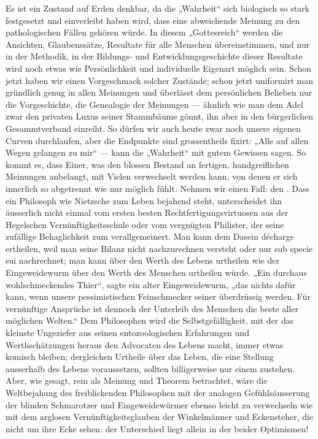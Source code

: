 Es ist ein Zustand auf Erden denkbar, da die „Wahrheit“ sich biologisch so stark festgesetzt und einverleibt haben wird, dass eine abweichende Meinung zu den pathologischen Fällen gehören würde. In diesem „Gottesreich“ werden die Ansichten, Glaubenssätze, Resultate für alle Menschen übereinstimmen, und nur in der Methodik, in der Bildungs- und Entwicklungsgeschichte dieser Resultate wird noch etwas wie Persönlichkeit und individuelle Eigenart möglich sein. Schon jetzt haben wir einen Vorgeschmack solcher Zustände; schon jetzt uniformirt man gründlich genug in allen Meinungen und überlässt dem persönlichen Belieben nur die Vorgeschichte, die Genealogie der Meinungen — ähnlich wie man dem Adel zwar den privaten Luxus seiner Stammbäume gönnt, ihn aber  in den bürgerlichen Gesammtverband einreiht. So dürfen wir auch heute zwar noch unsere eigenen Curven durchlaufen, aber die Endpunkte sind grossentheils fixirt: „Alle auf allen Wegen gelangen zu mir“ — kann die „Wahrheit“ mit gutem Gewissen sagen. So kommt es, dass Einer, was den blossen Bestand an fertigen, handgreiflichen Meinungen anbelangt, mit Vielen verwechselt werden kann, von denen er sich innerlich so abgetrennt wie nur möglich fühlt. Nehmen wir einen Fall: den . Dass ein Philosoph wie Nietzsche zum Leben bejahend steht, unterscheidet ihn äusserlich nicht einmal vom ersten besten Rechtfertigungsvirtuosen aus der Hegelschen Vernünftigkeitsschule oder vom vergnügten Philister, der seine zufällige Behaglichkeit zum    verallgemeinert. Man kann dem Dasein décharge ertheilen, weil man seine Bilanz nicht nachzurechnen versteht oder nur sub specie sui nachrechnet; man kann über den Werth des Lebens urtheilen wie der Eingeweidewurm über den Werth des Menschen urtheilen würde. „Ein durchaus wohlschmeckendes Thier“, sagte ein alter Eingeweidewurm, „das nichts dafür kann, wenn unsere pessimistischen Feinschmecker seiner überdrüssig werden. Für vernünftige Ansprüche ist dennoch der Unterleib des Menschen die beste aller möglichen Welten.“ Dem Philosophen wird die Selbstgefälligkeit, mit der das kleinste Ungeziefer aus seinen entozoologischen Erfahrungen und Werthschätzungen heraus den Advocaten des Lebens macht, immer etwas komisch bleiben; dergleichen Urtheile über das Leben, die eine Stellung ausserhalb des Lebens voraussetzen, sollten billigerweise nur einem  zustehen. Aber, wie gesagt, rein als Meinung und Theorem betrachtet, wäre die Weltbejahung des freiblickenden Philosophen mit der analogen Gefühlsäusserung der blinden Schmarotzer und Eingeweidewürmer ebenso leicht zu verwechseln wie mit dem arglosen Vernünftigkeitsglauben der Winkelmänner und Eckensteher, die nicht um ihre Ecke sehen: der Unterschied liegt allein in der  beider Optimismen!
\par

